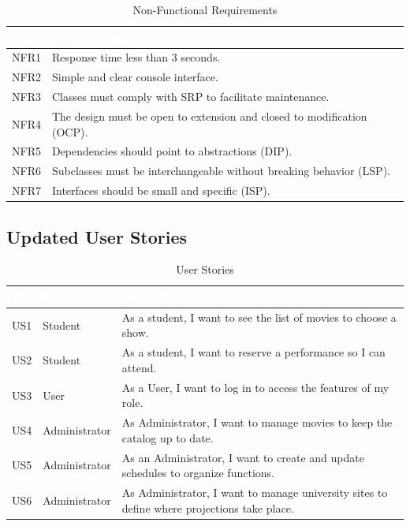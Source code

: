 \documentclass[12pt, letterpaper]{article}
\newcommand{\tableheader}[1]{\cellcolor{headerblue}\textcolor{white}{\textbf{#1}}}
\begin{document}
\begin{table}[H]
\centering
\caption{Non-Functional Requirements}
\begin{tabularx}{0.95\textwidth}{|>{\centering\arraybackslash}p{}|X|}
\hline
\rowcolor{headerblue}
\tableheader{ID} & \tableheader{Requirement} \\
\hline
\cellcolor{lightblue}NFR1 & Response time less than 3 seconds. \\
\hline
NFR2 & Simple and clear console interface. \\
\hline
\cellcolor{lightblue}NFR3 & Classes must comply with SRP to facilitate maintenance. \\
\hline
NFR4 & The design must be open to extension and closed to modification (OCP). \\
\hline
\cellcolor{lightblue}NFR5 & Dependencies should point to abstractions (DIP). \\
\hline
NFR6 & Subclasses must be interchangeable without breaking behavior (LSP). \\
\hline
\cellcolor{lightblue}NFR7 & Interfaces should be small and specific (ISP). \\
\hline
\end{tabularx}
\end{table}

\subsection{Updated User Stories}

\begin{table}[H]
\centering
\caption{User Stories}
\begin{tabularx}{0.95\textwidth}{|>{\centering\arraybackslash}p{}|>{\centering\arraybackslash}p{}|X|}
\hline
\rowcolor{white}
\tableheader{ID} & \tableheader{Role} & \tableheader{Description} \\
\hline
\cellcolor{white}US1 & Student & As a student, I want to see the list of movies to choose a show. \\
\hline
US2 & Student & As a student, I want to reserve a performance so I can attend. \\
\hline
\cellcolor{white}US3 & User & As a User, I want to log in to access the features of my role. \\
\hline
US4 & Administrator & As Administrator, I want to manage movies to keep the catalog up to date. \\
\hline
\cellcolor{white}US5 & Administrator & As an Administrator, I want to create and update schedules to organize functions. \\
\hline
US6 & Administrator & As Administrator, I want to manage university sites to define where projections take place. \\
\hline
\end{tabularx}
\end{table}
\end{document}

